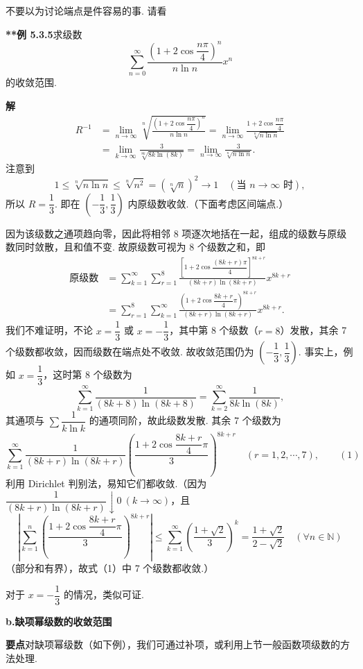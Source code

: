 \documentclass[UTF8,12pt,a4paper,fontset=fandol]{ctexart}
\begin{document}
不要以为讨论端点是件容易的事. 请看

\noindent\textbf{**例 5.3.5}\quad 求级数
\[
  \sum_{n=0}^{\infty}\frac{\left(1+2\cos\dfrac{n\pi}{4}\right)^n}{n\ln n}x^n
\]
的收敛范围.

\noindent\textbf{解}\quad
\[
\begin{aligned}
R^{-1}
&=\lim_{n\to\infty}\sqrt[n]{\frac{\left(1+2\cos\dfrac{n\pi}{4}\right)^n}{n\ln n}}
=\lim_{n\to\infty}\frac{1+2\cos\dfrac{n\pi}{4}}{\sqrt[n]{n\ln n}}\\
&=\lim_{k\to\infty}\frac3{\sqrt[8k]{8k\ln(8k)}}
=\lim_{n\to\infty}\frac3{\sqrt[n]{n\ln n}}.
\end{aligned}
\]
注意到
\[
  1\le\sqrt[n]{n\ln n}\le\sqrt[n]{n^2}=(\sqrt[n]{n})^2\to1\quad(\text{当 }n\to\infty\text{ 时}),
\]
所以 $R=\dfrac13$. 即在 $\left(-\dfrac13,\dfrac13\right)$ 内原级数收敛.（下面考虑区间端点.）

因为该级数之通项趋向零，因此将相邻 8 项逐次地括在一起，组成的级数与原级数同时敛散，且和值不变. 故原级数可视为 8 个级数之和，即
\[
\begin{aligned}
\text{原级数}
&=\sum_{k=1}^{\infty}\sum_{r=1}^{8}
\frac{\left[1+2\cos\dfrac{(8k+r)\pi}{4}\right]^{8k+r}}
{(8k+r)\ln(8k+r)}x^{8k+r}\\
&=\sum_{r=1}^{8}\sum_{k=1}^{\infty}
\frac{\left(1+2\cos\dfrac{8k+r}{4}\pi\right)^{8k+r}}
{(8k+r)\ln(8k+r)}x^{8k+r}.
\end{aligned}
\]
我们不难证明，不论 $x=\dfrac13$ 或 $x=-\dfrac13$，其中第 8 个级数（$r=8$）发散，其余 7 个级数都收敛，因而级数在端点处不收敛. 故收敛范围仍为
$\left(-\dfrac13,\dfrac13\right)$. 事实上，例如 $x=\dfrac13$，这时第 8 个级数为
\[
  \sum_{k=1}^{\infty}\frac1{(8k+8)\ln(8k+8)}
  =\sum_{k=2}^{\infty}\frac1{8k\ln(8k)},
\]
其通项与 $\displaystyle\sum\dfrac1{k\ln k}$ 的通项同阶，故此级数发散. 其余 7 个级数为
\[
  \sum_{k=1}^{\infty}\frac1{(8k+r)\ln(8k+r)}
  \left(\frac{1+2\cos\dfrac{8k+r}{4}\pi}{3}\right)^{8k+r}
  \quad(r=1,2,\cdots,7),
\qquad(1)
\]
利用 Dirichlet 判别法，易知它们都收敛.（因为
$\dfrac1{(8k+r)\ln(8k+r)}\downarrow0\ (k\to\infty)$，且
\[
  \left|\sum_{k=1}^{n}\left(\frac{1+2\cos\dfrac{8k+r}{4}\pi}{3}\right)^{8k+r}\right|
  \le\sum_{k=1}^{\infty}\left(\frac{1+\sqrt2}{3}\right)^k
  =\frac{1+\sqrt2}{2-\sqrt2}\quad(\forall n\in\mathbb N)
\]
（部分和有界），故式（1）中 7 个级数都收敛.）

对于 $x=-\dfrac13$ 的情况，类似可证.

\noindent\textbf{b.\quad 缺项幂级数的收敛范围}

\noindent\textbf{要点}\quad 对缺项幂级数（如下例），我们可通过补项，或利用上节一般函数项级数的方法处理.
\end{document}
